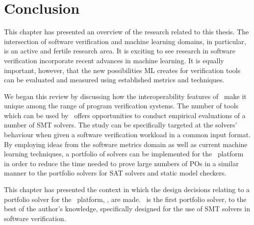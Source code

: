 \section{Conclusion}

This chapter has presented an overview of the research related to this thesis. 
The intersection of software verification and machine learning domains, in particular, is an active and fertile research area. 
It is exciting to see research in software verification incorporate recent advances in machine learning. 
It is equally important, however, that the new possibilities ML creates for verification tools can be evaluated and measured using established metrics and techniques. 

We began this review by discussing how the interoperability features of \why~make it unique among the range of program verification systems.
The number of tools which can be used by \why~offers opportunities to conduct empirical evaluations of a number of SMT solvers.
The study can be specifically targeted at the solvers' behaviour when given a software verification workload in a common input format.
By employing ideas from the software metrics domain as well as current machine learning techniques, a portfolio of solvers can be implemented for the \why~platform in order to reduce the time needed to prove large numbers of POs in a similar manner to the portfolio solvers for SAT solvers and static model checkers.

This chapter has presented the context in which the design decisions relating to a portfolio solver for the \why~platform, \where, are made. 
\where~is the first portfolio solver, to the best of the author's knowledge, specifically designed for the use of SMT solvers in software verification.    



   
